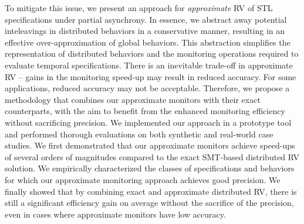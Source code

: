 To mitigate this issue, we present an approach for \emph{approximate} RV of STL specifications under partial asynchrony. In essence, we abstract away potential inteleavings in distributed behaviors in a conservative manner, resulting in an effective over-approximation of global behaviors. This abstraction simplifies the representation of distributed behaviors and the monitoring operations required to evaluate temporal specifications. There is an inevitable trade-off in approximate RV -- gains in the monitoring speed-up may result in reduced accuracy. For some applications, reduced accuracy may not be acceptable. Therefore, we propose a methodology that combines our approximate monitors with their exact counterparts, with the aim to benefit from the enhanced monitoring efficiency without sacrificing precision. We implemented our approach in a prototype tool and performed thorough evaluations on both synthetic and real-world case studies. We first demonstrated that our approximate monitors achieve speed-ups of several orders of magnitudes compared to the exact SMT-based distributed RV solution. We empirically characterized the classes of specifications and behaviors for which our approximate monitoring approach achieves good precision. We finally showed that by combining exact and approximate distributed RV, there is still a significant efficiency gain on average without the sacrifice of the precision, even in cases where approximate monitors have low accuracy.    